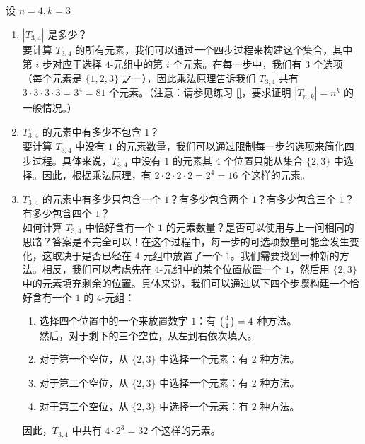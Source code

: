 \begin{example}
    设 $n=4, k=3$

    \begin{enumerate}[label=(\arabic*)]
        \item $|T_{3,4}|$ 是多少？\\
              要计算 $T_{3,4}$ 的所有元素，我们可以通过一个四步过程来构建这个集合，其中第 $i$ 步对应于选择 $4$-元组中的第 $i$ 个元素。在每一步中，我们有 $3$ 个选项（每个元素是 $\{1, 2, 3\}$ 之一），因此乘法原理告诉我们 $T_{3,4}$ 共有 $3 \cdot 3 \cdot 3 \cdot 3 = 3^4 = 81$ 个元素。（注意：请参见练习 \ref{}，要求证明 $|T_{n,k}| = n^k$ 的一般情况。）
        \item $T_{3,4}$ 的元素中有多少不包含 $1$？\\
              要计算 $T_{3,4}$ 中没有 $1$ 的元素数量，我们可以通过限制每一步的选项来简化四步过程。具体来说，$T_{3,4}$ 中没有 $1$ 的元素其 $4$ 个位置只能从集合 $\{2, 3\}$ 中选择。因此，根据乘法原理，有 $2 \cdot 2 \cdot 2 \cdot 2 = 2^4 = 16$ 个这样的元素。
        \item $T_{3,4}$ 的元素中有多少只包含一个 $1$？有多少包含两个 $1$？有多少包含三个 $1$？有多少包含四个 $1$？\\
              如何计算 $T_{3,4}$ 中恰好含有一个 $1$ 的元素数量？是否可以使用与上一问相同的思路？答案是不完全可以！在这个过程中，每一步的可选项数量可能会发生变化，这取决于是否已经在 $4$-元组中放置了一个 $1$。我们需要找到一种新的方法。相反，我们可以考虑先在 $4$-元组中的某个位置放置一个 $1$，然后用 $\{2, 3\}$ 中的元素填充剩余的位置。具体来说，我们可以通过以下四个步骤构建一个恰好含有一个 $1$ 的 $4$-元组：
              \begin{enumerate}[label=(\alph*)]
                  \item 选择四个位置中的一个来放置数字 $1$：有 $\big({4 \atop 1}\big)=4$ 种方法。\\
                        然后，对于剩下的三个空位，从左到右依次填入。
                  \item 对于第一个空位，从 $\{2, 3\}$ 中选择一个元素：有 $2$ 种方法。
                  \item 对于第二个空位，从 $\{2, 3\}$ 中选择一个元素：有 $2$ 种方法。
                  \item 对于第三个空位，从 $\{2, 3\}$ 中选择一个元素：有 $2$ 种方法。
              \end{enumerate}
              因此，$T_{3,4}$ 中共有 $4 \cdot 2^3 = 32$ 个这样的元素。
    \end{enumerate}


\end{example}
